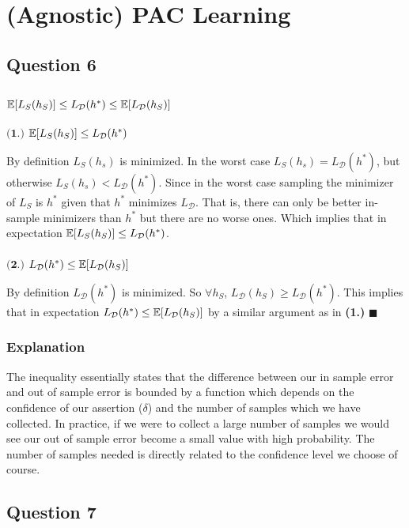 \documentclass[11pt, oneside]{article}   	%
\begin{document}
\newpage{}
\section{(Agnostic) PAC Learning}

\subsection{Question 6}
\subsubsection{$\Bbb E[L_S(h_S)] \leq L_{\mathcal{D}}(h^*) \leq \Bbb E[L_{\mathcal{D}}(h_S)]$}
$\textbf{(1.)}$ $\Bbb E[L_S(h_S)] \leq L_{\mathcal{D}}(h^*)$

By definition $L_S(h_s)$ is minimized.  In the worst case $L_S(h_s) = L_{\mathcal{D}}(h^*)$, but otherwise $L_S(h_s) < L_{\mathcal{D}}(h^*)$.  Since in the worst case sampling the minimizer of $L_S$ is $h^*$ given that $h^*$ minimizes $L_{\mathcal{D}}$.  That is, there can only be better in-sample minimizers than $h^*$ but there are no worse ones. Which implies that in expectation $\Bbb E[L_S(h_S)] \leq L_{\mathcal{D}}(h^*)$.\\ \\
$\textbf{(2.)}$ $L_{\mathcal{D}}(h^*) \leq \Bbb E[L_{\mathcal{D}}(h_S)]$

By definition $L_{\mathcal{D}}(h^*)$ is minimized.  So $\forall h_S$, $L_{\mathcal{D}}(h_S) \geq L_{\mathcal{D}}(h^*)$.  This implies that in expectation $L_{\mathcal{D}}(h^*) \leq \Bbb E[L_{\mathcal{D}}(h_S)]$ by a similar argument as in \textbf{(1.)} $\blacksquare$

\subsubsection{Explanation}
The inequality essentially states that the difference between our in sample error and out of sample error is bounded by a function which depends on the confidence of our assertion ($\delta$) and the number of samples which we have collected.  In practice, if we were to collect a large number of samples we would see our out of sample error become a small value with high probability.  The number of samples needed is directly related to the confidence level we choose of course.

\subsection{Question 7}
\end{document}
